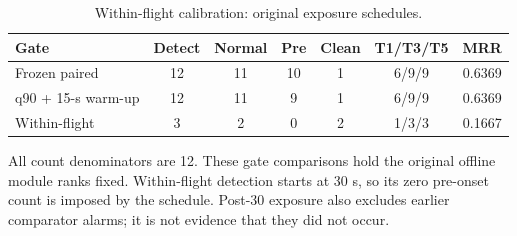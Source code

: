 \begin{table}[htbp]
\centering\footnotesize
\caption{Within-flight calibration: original exposure schedules.}
\label{tab:s_p14_full}
\renewcommand{\arraystretch}{1.15}
\setlength{\tabcolsep}{4pt}
\begin{tabular}{lcccccc}
\toprule
Gate & Detect & Normal & Pre & Clean & T1/T3/T5 & MRR\\
\midrule
Frozen paired & 12 & 11 & 10 & 1 & 6/9/9 & 0.6369\\
q90 + 15-s warm-up & 12 & 11 & 9 & 1 & 6/9/9 & 0.6369\\
Within-flight & 3 & 2 & 0 & 2 & 1/3/3 & 0.1667\\
\bottomrule
\end{tabular}
\par\smallskip\parbox{0.98\linewidth}{\scriptsize All count denominators are 12. These gate comparisons hold the original offline module ranks fixed. Within-flight detection starts at 30 s, so its zero pre-onset count is imposed by the schedule. Post-30 exposure also excludes earlier comparator alarms; it is not evidence that they did not occur.}
\end{table}
